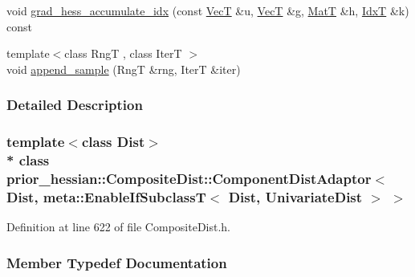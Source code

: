 \begin{DoxyCompactItemize}
\item 
void \hyperlink{classprior__hessian_1_1CompositeDist_1_1ComponentDistAdaptor_3_01Dist_00_01meta_1_1EnableIfSubclc6c9bd83bba546a81e521c87ad7ee6d3_ac58aa66e75b8ca803919fded5da5d5f9}{grad\+\_\+hess\+\_\+accumulate\+\_\+idx} (const \hyperlink{namespaceprior__hessian_a0b42fc70dec525d83fb2ac155d9ab974}{VecT} \&u, \hyperlink{namespaceprior__hessian_a0b42fc70dec525d83fb2ac155d9ab974}{VecT} \&g, \hyperlink{namespaceprior__hessian_aab58331a34ed4ef22b6022564fe74be3}{MatT} \&h, \hyperlink{namespaceprior__hessian_aa8d589f74e88bfa3b5750118acd1ab78}{IdxT} \&k) const 
\item 
{\footnotesize template$<$class RngT , class IterT $>$ }\\void \hyperlink{classprior__hessian_1_1CompositeDist_1_1ComponentDistAdaptor_3_01Dist_00_01meta_1_1EnableIfSubclc6c9bd83bba546a81e521c87ad7ee6d3_a1c3a065520a8c6351726f6407bc84f33}{append\+\_\+sample} (RngT \&rng, IterT \&iter)
\end{DoxyCompactItemize}


\subsubsection{Detailed Description}
\subsubsection*{template$<$class Dist$>$\\*
class prior\+\_\+hessian\+::\+Composite\+Dist\+::\+Component\+Dist\+Adaptor$<$ Dist, meta\+::\+Enable\+If\+Subclass\+T$<$ Dist, Univariate\+Dist $>$ $>$}



Definition at line 622 of file Composite\+Dist.\+h.



\subsubsection{Member Typedef Documentation}
